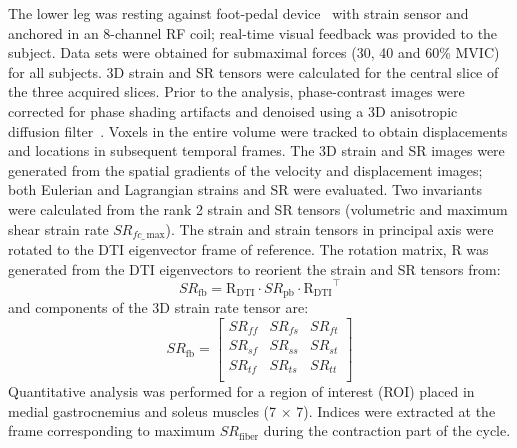 The lower leg was resting against foot-pedal device~\cite{RNSS10} with strain sensor and anchored in an 8-channel RF coil; real-time visual feedback was provided to the subject. 
Data sets were obtained for submaximal forces (30, 40 and 60\% MVIC) for all subjects. 
3D strain and SR tensors were calculated for the central slice of the three acquired slices. 
Prior to the analysis, phase-contrast images were corrected for phase shading artifacts and denoised using a 3D anisotropic diffusion filter~\cite{RNCS17}.
Voxels in the entire volume were tracked to obtain displacements and locations in subsequent temporal frames. 
The 3D strain and SR images were generated from the spatial gradients of the velocity and displacement images; both Eulerian and Lagrangian strains and SR were evaluated. 
Two invariants were calculated from the rank 2 strain and SR tensors (volumetric and maximum shear strain rate $SR_{fc\_\,\mathrm{max}}$). 
The strain and strain tensors in principal axis were rotated to the DTI eigenvector frame of reference. 
The rotation matrix, R was generated from the DTI eigenvectors to reorient the strain and SR tensors from:
\begin{equation}\label{eq: SRDTI}
SR_{\mathrm{fb}}=\mathrm{R_{DTI}}\cdot SR_{\mathrm{pb}} \cdot \mathrm{R_{DTI}}^\intercal
\end{equation}
and components of the 3D strain rate tensor are:
\begin{equation}
SR_{\mathrm{fb}} =\left[
\begin{array}{ccc}
SR_{ff} & SR_{fs} & SR_{ft} \\[4pt]
SR_{sf} & SR_{ss} & SR_{st} \\[4pt]
SR_{tf} & SR_{ts} & SR_{tt} \\
\end{array}\right]
\end{equation}
Quantitative analysis was performed for a region of interest (ROI) placed in medial gastrocnemius and soleus muscles (7 $\times$ 7).
Indices were extracted at the frame corresponding to maximum $SR_\mathrm{fiber}$ during the contraction part of the cycle.
